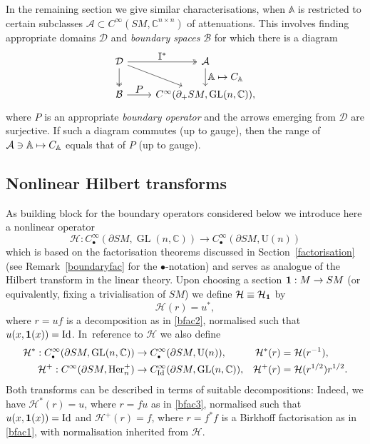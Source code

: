 \documentclass[JEP,XML,SOM,Unicode,published]{cedram}
\newcommand\mto{\mathchoice{\longmapsto}{\mapsto}{\mapsto}{\mapsto}}
\let\ts\textstyle
\DeclareMathOperator{\GL}{GL}
\newcommand{\rU}{\mathrm{U}}
\theoremstyle{plain}
\theoremstyle{definition}
\newcommand{\A}{\mathbb{A}}
\newcommand{\I}{\mathbb{I}}
\newcommand{\C}{\mathbb{C}}
\renewcommand{\H}{\mathcal{H}}
\newcommand{\he}{\textup{Her}}
\newcommand{\Id}{\mathrm{Id}}
\newcommand{\1}{{\bf 1}}
\newcommand{\extend}{{\scriptscriptstyle\bullet}}
\begin{document}
In the remaining section we give similar characterisations, when $\A$ is restricted to certain subclasses $\mathcal{A}\subset C^\infty(SM,\C^{n\times n})$ of attenuations. This involves finding appropriate domains $\mathcal{D}$ and \emph{boundary spaces} $\mathcal{B}$ for which there is a diagram
\begin{equation*}
\begin{tikzcd}
\mathcal{D} \arrow[two heads]{r}{\ts\I^*} \arrow{dr} \arrow[two heads]{d} &\mathcal{A}\arrow{d}{\ts\A\mto C_\A}\\
\mathcal{B} \arrow{r}{\ts P} & C^\infty(\partial_+SM,\GL(n,\C)),
\end{tikzcd}
\end{equation*}
where $P$ is an appropriate \emph{boundary operator} and the arrows emerging from $\mathcal D$ are surjective. If such a diagram commutes (up to gauge), then the range of $\mathcal{A}\ni \A\mto C_\A$ equals that of $P$ (up to gauge).

\subsection{Nonlinear Hilbert transforms} \label{hilbertsection} As building block for the boundary operators considered below we introduce here a nonlinear operator
\begin{equation}\label{hilbert1}
\H:C_\extend^\infty(\partial SM,\GL(n,\C)) \to C_\extend^\infty(\partial SM,\rU(n))
\end{equation}
which is based on the factorisation theorems discussed in Section~\ref{factorisation} (see Remark~\ref{boundaryfac} for the $\extend$-notation) and serves as analogue of the Hilbert transform in the linear theory. Upon choosing a section ${\1}: M \to SM$ (or equivalently, fixing a trivialisation of $SM$) we define $\H\equiv\H_{\1}$ by
\begin{equation*}
\H (r) = u^*,
\end{equation*}
where $r=uf$ is a decomposition as in \eqref{bfac2}, normalised such that $u(x,{\1}(x))=\Id$. In~reference to $\H$ we also define
\begin{align}
\H^*:C_\extend^\infty(\partial SM,\GL(n,\C)) &\to C_\extend^\infty(\partial SM,\rU(n)),& \H^*(r) &=\H(r^{-1}),\notag\\
\H^+:C^\infty(\partial SM,\he^+_n) &\to C_\Id^\infty(\partial SM,\GL(n,\C)),& \H^+(r) &=\H(r^{1/2})r^{1/2}. \label{hilbert+}
\end{align}
Both transforms can be described in terms of suitable decompositions: Indeed, we have $\H^*(r)=u$, where $r=fu$ as in \eqref{bfac3}, normalised such that $u(x,\1(x))=\Id$ and $\H^+(r)=f$, where $r=f^*f$ is a Birkhoff factorisation as in \eqref{bfac1}, with normalisation inherited from $\H$.
\end{document}
